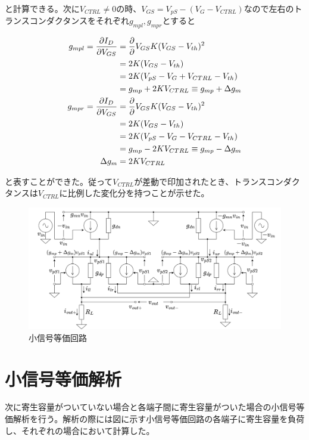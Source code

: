 \documentclass[twocolumn]{jsarticle}
\begin{document}
と計算できる。次に$V_{CTRL}\neq0$の時、$V_{GS}=V_{pS}- \left( V_{G}-V_{CTRL} \right)$なので左右のトランスコンダクタンスをそれぞれ$g_{mpl},g_{mpr}$とすると

\begin{align}
    g_{mpl} = \frac{\partial I_{D}}{\partial V_{GS}} &= \frac{\partial}{\partial }V_{GS} K(V_{GS}-V_{th})^{2} \notag\\
    &=2K(V_{GS}-V_{th})    \notag\\ 
    &=2K(V_{pS}-V_{G}+V_{CTRL}-V_{th})  \notag\\
    &=g_{mp}+2KV_{CTRL}\equiv g_{mp}+\Delta g_{m}   \label{eq:g_mpl}\\
    g_{mpr} = \frac{\partial I_{D}}{\partial V_{GS}} &= \frac{\partial}{\partial }V_{GS} K(V_{GS}-V_{th})^{2} \notag\\
    &=2K(V_{GS}-V_{th})    \notag\\ 
    &=2K(V_{pS}-V_{G}-V_{CTRL}-V_{th})  \notag\\
    &=g_{mp}-2KV_{CTRL}\equiv g_{mp}-\Delta g_{m}   \label{eq:g_mpr}\\
    \Delta g_{m}&=2KV_{CTRL}   \label{eq:delta_gm}
\end{align}

と表すことができた。従って$V_{CTRL}$が差動で印加されたとき、トランスコンダクタンスは$V_{CTRL}$に比例した変化分を持つことが示せた。

\begin{figure}[h]
    \begin{center}
        \includegraphics*[width=160mm]{figures/FoldedGilbertBaseEquivalentCircuit.png}
        \caption{小信号等価回路}
        \label{fgi:base_equiv}
    \end{center}
\end{figure}


\section{小信号等価解析}
次に寄生容量がついていない場合と各端子間に寄生容量がついた場合の小信号等価解析を行う。解析の際には図に示す小信号等価回路の各端子に寄生容量を負荷し、それぞれの場合において計算した。
\end{document}
